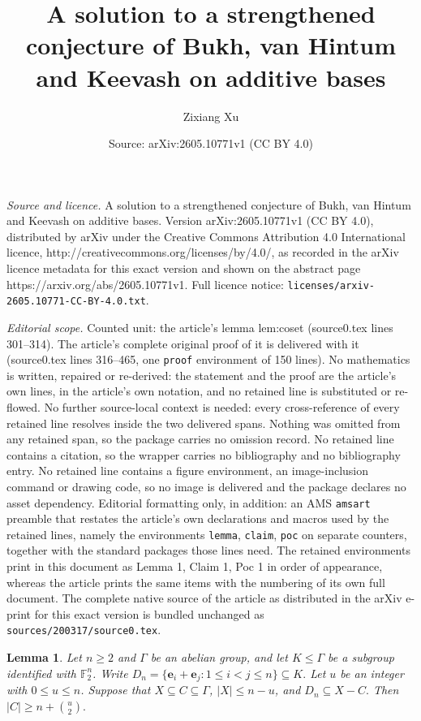 \documentclass[10pt,a4paper]{amsart}
\title{A solution to a strengthened conjecture of Bukh, van Hintum and Keevash on additive bases}
\author{Zixiang Xu}
\date{Source: arXiv:2605.10771v1 (CC BY 4.0)}
\newtheorem{lemma}{Lemma}
\begin{document}
\maketitle

\noindent\emph{Source and licence.} A solution to a strengthened conjecture of Bukh, van Hintum and Keevash on additive bases. Version arXiv:2605.10771v1 (CC BY 4.0), distributed by arXiv under the Creative Commons Attribution 4.0 International licence, http://creativecommons.org/licenses/by/4.0/, as recorded in the arXiv licence metadata for this exact version and shown on the abstract page https://arxiv.org/abs/2605.10771v1. Full licence notice: \texttt{licenses/arxiv-2605.10771-CC-BY-4.0.txt}.\par\smallskip

\noindent\textit{Editorial scope.} Counted unit: the article's lemma lem:coset (source0.tex lines 301--314). The article's complete original proof of it is delivered with it (source0.tex lines 316--465, one \texttt{proof} environment of 150 lines). No mathematics is written, repaired or re-derived: the statement and the proof are the article's own lines, in the article's own notation, and no retained line is substituted or re-flowed.  No further source-local context is needed: every cross-reference of every retained line resolves inside the two delivered spans.  Nothing was omitted from any retained span, so the package carries no omission record.  No retained line contains a citation, so the wrapper carries no bibliography and no bibliography entry.  No retained line contains a figure environment, an image-inclusion command or drawing code, so no image is delivered and the package declares no asset dependency.  Editorial formatting only, in addition: an AMS \texttt{amsart} preamble that restates the article's own declarations and macros used by the retained lines, namely the environments \texttt{lemma}, \texttt{claim}, \texttt{poc} on separate counters, together with the standard packages those lines need.  The retained environments print in this document as Lemma 1, Claim 1, Poc 1 in order of appearance, whereas the article prints the same items with the numbering of its own full document.  The complete native source of the article as distributed in the arXiv e-print for this exact version is bundled unchanged as \texttt{sources/200317/source0.tex}.
\begin{lemma}\label{lem:coset}
Let \(n\ge 2\) and \(\Gamma\) be an abelian group, and let \(K\le \Gamma\) be a subgroup identified with \(\mathbb{F}_2^n\). Write
\(
    D_n=\{\boldsymbol{e}_i+\boldsymbol{e}_j:1\le i<j\le n\}\subseteq K.
\)
Let \(u\) be an integer with \(0\le u\le n\). Suppose that \(X\subseteq C\subseteq \Gamma\), \(|X|\le n-u\), and
\(
    D_n\subseteq X-C.
\)
Then
\(
    |C|\ge n+\binom{u}{2}.
\)
\end{lemma}
\end{document}
